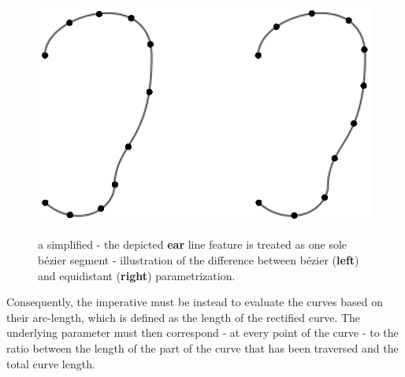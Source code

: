 \def\earpathf{(-1,1.5) .. controls (-1,2.3) and (1,2.8) .. (1,1.5) .. controls (1, -.2) and (0.3,-.1) .. (0.3,-1) .. controls (0.2,-1.5) and (-.5, -1.7) .. (-1,-1.25);}
\def\earpaths{(3,1.5) .. controls (3,2.3) and (5,2.8) .. (5,1.5) .. controls (5, -.2) and (4.3,-.1) .. (4.3,-1) .. controls (4.2,-1.5) and (3.5, -1.7) .. (3,-1.25);}
\begin{figure}[h!]
    \centering
    \includegraphics{./resources/figures/ears_diffparam.eps}
    \label{fig:diffparam}
    \caption{a simplified - the depicted \textbf{ear} line feature is treated as one sole b\'{e}zier segment - illustration of the difference between b\'{e}zier (\textbf{left}) and equidistant (\textbf{right}) parametrization.}

\end{figure}
Consequently, the imperative must be instead to evaluate the curves based on their arc-length, which is defined as the length of the rectified curve. The underlying parameter must then correspond - at every point of the curve - to the ratio between the length of the part of the curve that has been traversed and the total curve length.

